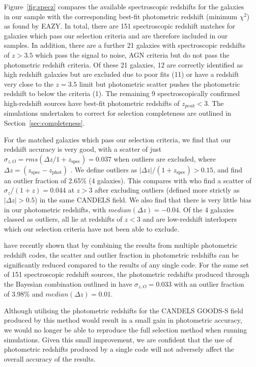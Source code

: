 Figure~\ref{fig:specz} compares the available spectroscopic redshifts for the galaxies in our sample with the corresponding best-fit photometric redshift (minimum $\chi^2$) as found by EAZY. In total, there are 151 spectroscopic redshift matches for galaxies which pass our selection criteria and are therefore included in our samples. In addition, there are a further 21 galaxies with spectroscopic redshifts of $z > 3.5$ which pass the signal to noise, AGN criteria but do not pass the photometric redshift criteria. Of these 21 galaxies, 12 are correctly identified as high redshift galaxies but are excluded due to poor fits (11) or have a redshift very close to the $z = 3.5$ limit but photometric scatter pushes the photometric redshift to below the criteria (1). The remaining 9 spectroscopically confirmed high-redshift sources have best-fit photometric redshifts of $z_{peak} < 3$. The simulations undertaken to correct for selection completeness are outlined in Section~\ref{sec:completeness}.

For the matched galaxies which pass our selection criteria, we find that our redshift accuracy is very good, with a scatter of just $\sigma_{z,O} = rms(\Delta z /1+z_{\text{spec}}) = 0.037$ when outliers are excluded, where $\Delta z =  (z_{\text{spec}}-z_{\text{phot}})$ \citep{Dahlen:2013eu}. We define outliers as $\left | \Delta z \right |/(1+z_{\text{spec}}) > 0.15$, and find an outlier fraction of 2.65\% (4 galaxies). This compares with \citet{2012ApJ...756..164F} who find a scatter of $\sigma_{z}/(1+z) = 0.044$  at $z > 3$ after excluding outliers (defined more strictly as $\left | \Delta z \right | > 0.5$) in the same CANDELS field. We also find that there is very little bias in our photometric redshifts, with $median(\Delta z) = -0.04$. Of the 4 galaxies classed as outliers, all lie at redshifts of $z < 3$ and are low-redshift interlopers which our selection criteria have not been able to exclude.

\citet{Dahlen:2013eu} have recently shown that by combining the results from multiple photometric redshift codes, the scatter and outlier fraction in photometric redshifts can be significantly reduced compared to the results of any single code. For the same set of 151 spectroscopic redshift sources, the photometric redshifts produced through the Bayesian combination outlined in \citet{Dahlen:2013eu} have $\sigma_{z,O} = 0.033$ with an outlier fraction of 3.98\% and $median(\Delta z) = 0.01$. 

Although utilising the photometric redshifts for the CANDELS GOODS-S field produced by this method would result in a small gain in photometric accuracy, we would no longer be able to reproduce the full selection method when running simulations. Given this small improvement, we are confident that the use of photometric redshifts produced by a single code will not adversely affect the overall accuracy of the results.

